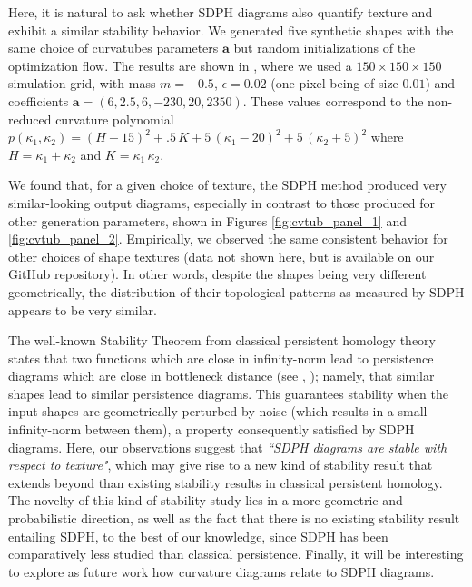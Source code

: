 \documentclass[11pt]{article}
\newcommand{\eps}{\epsilon}
\newcommand{\kap}{\kappa}
\theoremstyle{plain}
\theoremstyle{definition}
\theoremstyle{remark}
\begin{document}
	Here, it is natural to ask whether SDPH diagrams also quantify texture and exhibit a similar stability behavior. 
	We generated five synthetic shapes with the same choice of curvatubes parameters $\mathbf{a}$ but random initializations of the optimization flow. The results are shown in ,
	where we used a $150 \times 150 \times 150$ simulation grid, with mass $m = -0.5$, $\eps = 0.02$ (one pixel being of size $0.01$) and coefficients $\mathbf{a} = (6, 2.5, 6, -230, 20, 2350)$. These values correspond to the non-reduced curvature polynomial $p(\kap_1,\kap_2) = (H-15)^2 + .5 \, K + 5 \, (\kap_1 - 20)^2 + 5 \, (\kap_2 + 5)^2 $ where $H = \kap_1 + \kap_2$ and $K = \kap_1 \, \kap_2$.
	
	
	We found that, for a given choice of texture, the SDPH method produced very similar-looking output diagrams, especially in contrast to those produced for other generation parameters, shown in Figures \ref{fig:cvtub_panel_1} and \ref{fig:cvtub_panel_2}. Empirically, we observed the same consistent behavior for other choices of shape textures (data not shown here, but is available on our GitHub repository).
	In other words, despite the shapes being very different geometrically, the distribution of their topological patterns as measured by SDPH appears to be very similar. 
	
	The well-known Stability Theorem \citep{cohen-steiner_stability_2007} from classical persistent homology theory states that two functions which are close in infinity-norm lead to persistence diagrams which are close in bottleneck distance (see , ); namely, that similar shapes lead to similar persistence diagrams. This guarantees stability when the input shapes are geometrically perturbed by noise (which results in a small infinity-norm between them), a property consequently satisfied by SDPH diagrams. Here, our observations suggest that \textit{``SDPH diagrams are stable with respect to texture"}, which may give rise to a new kind of stability result that extends beyond than existing stability results in classical persistent homology. The novelty of this kind of stability study lies in a more geometric and probabilistic direction, as well as the fact that there is no existing stability result entailing SDPH, to the best of our knowledge, since SDPH has been comparatively less studied than classical persistence. Finally, it will be interesting to explore as future work how curvature diagrams relate to SDPH diagrams. 
	
\end{document}
